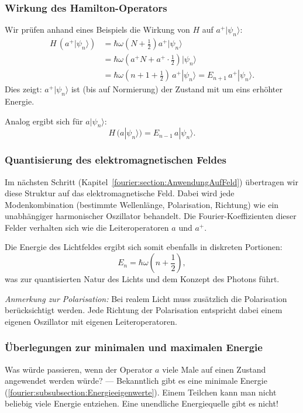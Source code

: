 		\subsubsection{Wirkung des Hamilton-Operators\label{fourier:subsubsection:WirkungHamiltonoperator}}
			Wir prüfen anhand eines Beispiels die Wirkung von $H$ auf $a^+|\psi_n\rangle$:
			\begin{align}
				H\, (a^+|\psi_n\rangle)
				&= \hbar\omega (N + \tfrac{1}{2}) a^+|\psi_n\rangle \\
				&= \hbar\omega (a^+ N + a^+ \cdot \tfrac{1}{2}) |\psi_n\rangle \\
				&= \hbar\omega (n + 1 + \tfrac{1}{2})\, a^+|\psi_n\rangle = E_{n+1}\, a^+|\psi_n\rangle.
			\end{align}
			Dies zeigt:
			$a^+|\psi_n\rangle$ ist (bis auf Normierung) der Zustand mit um eins erhöhter Energie.

			Analog ergibt sich für $a|\psi_n\rangle$:
			\[
				H\, (a|\psi_n\rangle) = E_{n-1}\, a|\psi_n\rangle.
			\]

		\subsubsection{Quantisierung des elektromagnetischen Feldes\label{fourier:subsubsection:QuantisierungElmagFeld}}
			Im nächsten Schritt (Kapitel~\ref{fourier:section:AnwendungAufFeld}) übertragen wir diese Struktur auf das elektromagnetische Feld.
			Dabei wird jede Modenkombination (bestimmte Wellenlänge, Polarisation, Richtung) wie ein unabhängiger harmonischer Oszillator behandelt.
			Die Fourier-Koeffizienten dieser Felder verhalten sich wie die Leiteroperatoren $a$ und $a^+$.

			Die Energie des Lichtfeldes ergibt sich somit ebenfalls in diskreten Portionen:
			\[
				E_n = \hbar\omega\left(n + \frac{1}{2}\right),
			\]
			was zur quantisierten Natur des Lichts und dem Konzept des Photons führt.

			\textit{Anmerkung zur Polarisation:} Bei realem Licht muss zusätzlich die Polarisation berücksichtigt werden.
			Jede Richtung der Polarisation entspricht dabei einem eigenen Oszillator mit eigenen Leiteroperatoren.

		\subsubsection{Überlegungen zur minimalen und maximalen Energie\label{fourier:subsubsection:MinMaxEnergie}}
			Was würde passieren, wenn der Operator $a$ viele Male auf einen Zustand angewendet werden würde? ---
			Bekanntlich gibt es eine minimale Energie (\ref{fourier:subsubsection:Energieeigenwerte}).
			Einem Teilchen kann man nicht beliebig viele Energie entziehen.
			Eine unendliche Energiequelle gibt es nicht!

